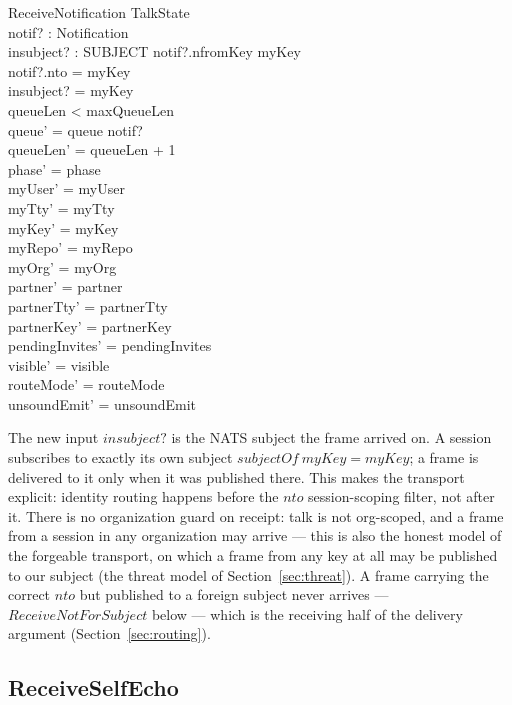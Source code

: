 \documentclass[a4paper,10pt,fleqn]{article}
\begin{document}
\begin{schema}{ReceiveNotification}
  \Delta TalkState \\
  notif? : Notification \\
  insubject? : SUBJECT
\where
  notif?.nfromKey \neq myKey \\
  notif?.nto = myKey \\
  insubject? = myKey \\
  queueLen < maxQueueLen \\
  queue' = queue \cat \langle notif? \rangle \\
  queueLen' = queueLen + 1 \\
  phase' = phase \\
  myUser' = myUser \\
  myTty' = myTty \\
  myKey' = myKey \\
  myRepo' = myRepo \\
  myOrg' = myOrg \\
  partner' = partner \\
  partnerTty' = partnerTty \\
  partnerKey' = partnerKey \\
  pendingInvites' = pendingInvites \\
  visible' = visible \\
  routeMode' = routeMode \\
  unsoundEmit' = unsoundEmit
\end{schema}

The new input $insubject?$ is the NATS subject the frame arrived on.  A
session subscribes to exactly its own subject $subjectOf~myKey = myKey$;
a frame is delivered to it only when it was published there.  This makes
the transport explicit: identity routing happens before the $nto$
session-scoping filter, not after it.  There is no organization guard on
receipt: talk is not org-scoped, and a frame from a session in any
organization may arrive --- this is also the honest model of the forgeable
transport, on which a frame from any key at all may be published to our
subject (the threat model of Section~\ref{sec:threat}).  A frame carrying
the correct $nto$ but published to a foreign subject never arrives ---
$ReceiveNotForSubject$ below --- which is the receiving half of the
delivery argument (Section~\ref{sec:routing}).

\subsection{ReceiveSelfEcho}
\end{document}

